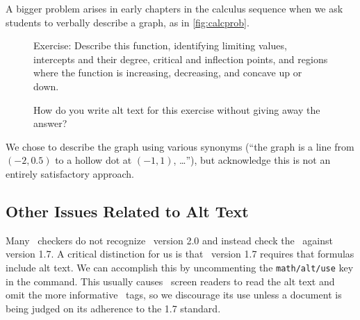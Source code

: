 \documentclass{ltugboat}
\begin{document}
A bigger problem arises in early chapters in the calculus sequence
when we ask students to verbally describe a graph,
as in \autoref{fig:calcprob}.
%
\begin{figure}
  Exercise: Describe this function, identifying limiting values, intercepts
  and their degree, critical and inflection points,
  and regions where the function is increasing, decreasing, and
  concave up or down.
  \begin{center}
  \end{center}
  \caption{\label{fig:calcprob}How do you write alt text for this exercise
  without giving away the answer?}
\end{figure}
We chose to describe the graph using various synonyms
(``the graph is a line from $(-2,0.5)$ to a hollow dot at $(-1,1)$, \dots''),
but acknowledge this is not an entirely satisfactory approach.

\subsection{Other Issues Related to Alt Text}

Many \PDF\ checkers do not recognize \PDF\ version 2.0 and
instead check the \PDF\ against version 1.7.
A critical distinction for us is that \PDF\ version 1.7 requires that
formulas include alt text.
We can accomplish this by uncommenting the \texttt{math/alt/use}
key in the  command.
This usually causes \PDF\ screen readers to read the alt text and
omit the more informative \MathML\ tags, so we discourage its use
unless a document is being judged on its adherence to the 1.7 standard.
\end{document}
